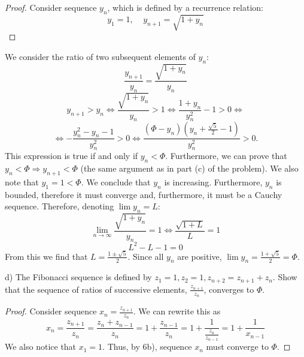 \documentclass{article}
\begin{document}
\begin{proof}
Consider sequence $y_n$, which is defined by a recurrence relation:
$$ y_1 = 1, \>\>\>\>\> y_{n+1} = \sqrt{1 + y_n} $$
\end{proof}

We consider the ratio of two subsequent elements of $y_n$:
$$ \frac{y_{n+1}}{y_n} = \frac{\sqrt{1+y_n}}{y_n} $$
$$ y_{n+1} > y_n \iff \frac{\sqrt{1+y_n}}{y_n} > 1 \iff \frac{1+y_n}{y_n^2} -1 > 0 \iff $$
$$ \iff -\frac{y_n^2-y_n-1}{y_n^2} > 0 \iff \frac{(\Phi-y_n)(y_n+\frac{\sqrt{5}}{2}-1)}{y_n^2} > 0. $$
This expression is true if and only if $y_n < \Phi$. Furthermore, we can prove that $y_n < \Phi \Rightarrow y_{n+1} < \Phi$ (the same argument as in part (c) of the problem). We also note that $y_1 = 1 < \Phi$. We conclude that $y_n$ is increasing. Furthermore, $y_n$ is bounded, therefore it must converge and, furthermore, it must be a Cauchy sequence. Therefore, denoting $\lim y_n = L$:
$$ \lim_{n \to \infty} \frac{\sqrt{1+y_n}}{y_n} = 1 \iff \frac{\sqrt{1+L}}{L} = 1 $$
$$ L^2 - L - 1 = 0 $$
From this we find that $L = \frac{1 \pm \sqrt{5}}{2}$. Since all $y_n$ are positive, $\lim y_n = \frac{1+\sqrt{5}}{2} = \Phi$.


\begin{tcolorbox}
d) The Fibonacci sequence is defined by $z_1 = 1, z_2 = 1, z_{n+2} = z_{n+1} + z_n$. Show that the
sequence of ratios of successive elements, $\frac{z_{n+1}}{z_n}$, converges to $\Phi$.
\end{tcolorbox}
\begin{proof}
Consider sequence $x_n = \frac{z_{n+1}}{z_n}$. We can rewrite this as
$$ x_n = \frac{z_{n+1}}{z_n} = \frac{z_{n}+z_{n-1}}{z_n} = 1 + \frac{z_{n-1}}{z_n} = 1 + \frac{1}{\frac{z_n}{z_{n-1}}} = 1+\frac{1}{x_{n-1}}$$
We also notice that $x_1 = 1$. Thus, by 6b), sequence $x_n$ must converge to $\Phi$.
\end{proof}
\end{document}
